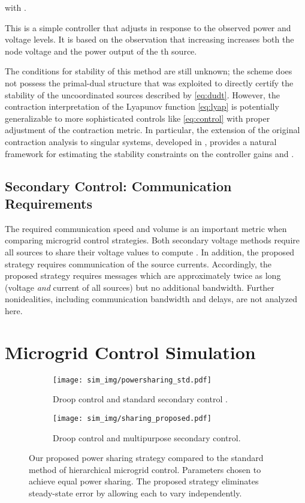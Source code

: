 \documentclass[letterpaper, 10 pt, conference]{ieeeconf}
\begin{document}
with .

This is a simple controller that adjusts  in response to the observed power and voltage levels. It is based on the observation that increasing  increases both the node voltage  and the power output of the th source.

The conditions for stability of this method are still unknown; the scheme does not possess the primal-dual structure that was exploited to directly certify the stability of the uncoordinated sources described by \eqref{eq:dudt}. However, the contraction interpretation of the Lyapunov function \eqref{eq:lyap} is potentially generalizable to more sophisticated controls like \eqref{eq:control} with proper adjustment of the contraction metric. In particular, the extension of the original contraction analysis to singular systems, developed in  \cite{del2013contraction,bousquet2015contraction}, provides a natural framework for estimating the stability constraints on the controller gains  and .

\subsection{Secondary Control: Communication Requirements}

The required communication speed and volume is an important metric when comparing microgrid control strategies. Both secondary voltage methods require all sources to share their voltage values to compute . In addition, the proposed strategy requires communication of the source currents. Accordingly, the proposed strategy requires messages which are approximately twice as long (voltage \textit{and} current of all sources) but no additional bandwidth. Further nonidealities, including communication bandwidth and delays, are not analyzed here.

\section{Microgrid Control Simulation}\label{sec:sim}

\begin{figure*}[t!]
\begin{subfigure}{.43\textwidth}
  \centering
  \texttt{[image: sim\_img/powersharing\_std.pdf]}
  \caption{Droop control and standard secondary control \cite{GuerreroHierarchy}.}
  \label{fig:power_std}
\end{subfigure}
\hfill
\begin{subfigure}{.5\textwidth}
  \centering
  \texttt{[image: sim\_img/sharing\_proposed.pdf]}
  \caption{Droop control and multipurpose secondary control.}
  \label{fig:power_us}
\end{subfigure}
\caption{Our proposed power sharing strategy compared to the standard method of hierarchical microgrid control. Parameters chosen to achieve equal power sharing. The proposed strategy eliminates steady-state error by allowing each  to vary independently.}
\label{fig:power}
\end{figure*}
\end{document}
